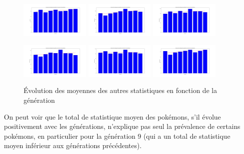 \documentclass[a4paper,12pt]{article}
\begin{document}
\begin{figure}[!h]
    \centering

    \includegraphics[width=0.3\textwidth]{Image/hp_avg.png}
    \includegraphics[width=0.3\textwidth]{Image/atk_avg.png}
    \includegraphics[width=0.3\textwidth]{Image/def_avg.png}

    \vspace{1em}  %

    \includegraphics[width=0.3\textwidth]{Image/spatk_avg.png}
    \includegraphics[width=0.3\textwidth]{Image/spdef_avg.png}
    \includegraphics[width=0.3\textwidth]{Image/speed_avg_2.png}

    \caption{Évolution des moyennes des autres statistiques en fonction de la génération}
\end{figure}
\newpage
On peut voir que le total de statistique moyen des pokémons, s'il évolue
positivement avec les générations, n'explique pas seul la prévalence de certains
pokémons, en particulier pour la génération 9 (qui a un total de statistique
moyen inférieur aux générations précédentes).
\end{document}
